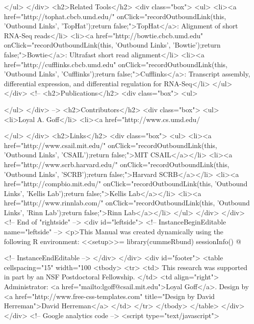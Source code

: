             </ul>
          </div>
          <h2>Related Tools</h2>
          <div class="box">
            <ul>
              <li><a href="http://tophat.cbcb.umd.edu/"  onClick="recordOutboundLink(this, 'Outbound Links', 'TopHat');return false;">TopHat</a>:
                Alignment of short RNA-Seq reads</li>
              <li><a href="http://bowtie.cbcb.umd.edu" onClick="recordOutboundLink(this, 'Outbound Links', 'Bowtie');return false;">Bowtie</a>:
                Ultrafast short read alignment</li>
              <li><a href="http://cufflinks.cbcb.umd.edu" onClick="recordOutboundLink(this, 'Outbound Links', 'Cufflinks');return false;">Cufflinks</a>:
                Transcript assembly, differential expression, and differential regulation for RNA-Seq</li>
            </ul>
          </div>
          <!--
          <h2>Publications</h2>
          <div class="box">
            <ul>
              
            </ul>
          </div>
          -->
          <h2>Contributors</h2>
          <div class="box">
            <ul>
              <li>Loyal A. Goff</li>
              <li><a href="http://www.cs.umd.edu/%
             
            </ul>
          </div>
          <h2>Links</h2>
          <div class="box">
            <ul>
              <li><a href="http://www.csail.mit.edu/" onClick="recordOutboundLink(this, 'Outbound Links', 'CSAIL');return false;">MIT CSAIL</a></li>
              <li><a href="http://www.scrb.harvard.edu/" onClick="recordOutboundLink(this, 'Outbound Links', 'SCRB');return false;">Harvard SCRB</a></li>
              <li><a href="http://compbio.mit.edu/" onClick="recordOutboundLink(this, 'Outbound Links', 'Kellis Lab');return false;">Kellis Lab</a></li>
              <li><a href="http://www.rinnlab.com/"  onClick="recordOutboundLink(this, 'Outbound Links', 'Rinn Lab');return false;">Rinn Lab</a></li>
            </ul>
          </div>
        </div>
        <!-- End of "rightside" -->
        <div id="leftside">
        <!-- InstanceBeginEditable name="leftside" -->
		<p>This Manual was created dynamically using the following R environment:
        <<setup>>=
        library(cummeRbund)
        sessionInfo()
        @

        <!-- InstanceEndEditable -->
        </div>
        </div>
      <div id="footer">
        <table cellspacing="15" width="100%
          <tbody>
            <tr>
              <td> This research was supported in part by an NSF Postdoctoral Fellowship. </td>
              <td align="right"> Administrator: <a
                  href="mailto:lgoff@csail.mit.edu">Loyal Goff</a>.
                Design by <a href="http://www.free-css-templates.com"
                  title="Design by David Herreman">David Herreman</a> </td>
            </tr>
          </tbody>
        </table>
      </div>
    </div>
    <!-- Google analytics code -->
		<script type="text/javascript">
        

